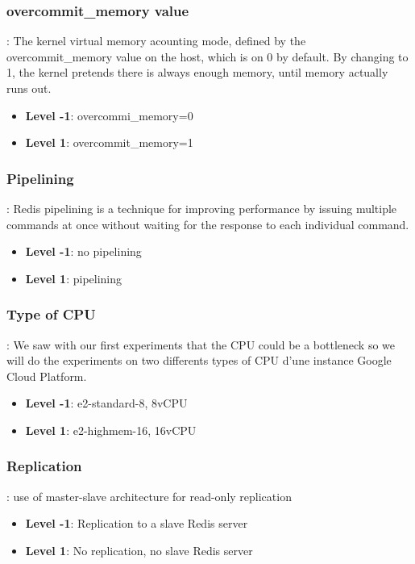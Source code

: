 \documentclass[runningheads]{llncs}
\begin{document}
\subsubsection{overcommit\_memory value}: The kernel virtual memory acounting mode, defined by the overcommit\_memory value on the host, which is on 0 by default. By changing to 1, the kernel pretends there is always enough memory, until memory actually runs out.
\begin{itemize}
    \item \textbf{Level -1}: overcommi\_memory=0
    \item \textbf{Level 1}: overcommit\_memory=1
\end{itemize}

\subsubsection{Pipelining}: Redis pipelining is a technique for improving performance by issuing multiple commands at once without waiting for the response to each individual command. \begin{itemize}
    \item \textbf{Level -1}: no pipelining
    \item \textbf{Level 1}: pipelining
\end{itemize}

\subsubsection{Type of CPU}: We saw with our first experiments that the CPU could be a bottleneck so we will do the experiments on two differents types of CPU d'une instance Google Cloud Platform.
\begin{itemize}
    \item \textbf{Level -1}: e2-standard-8, 8vCPU
    \item \textbf{Level 1}: e2-highmem-16, 16vCPU
\end{itemize}

\subsubsection{Replication}: use of master-slave architecture for read-only replication
\begin{itemize}
    \item \textbf{Level -1}: Replication to a slave Redis server
    \item \textbf{Level 1}: No replication, no slave Redis server
\end{itemize}
\end{document}
